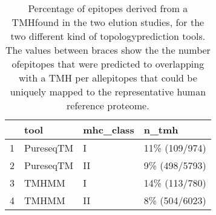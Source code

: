 \begin{table}[ht]
\centering
\begin{tabular}{rlll}
  \hline
 & tool & mhc\_class & n\_tmh \\ 
  \hline
1 & PureseqTM & I & 11\% (109/974) \\ 
  2 & PureseqTM & II & 9\% (498/5793) \\ 
  3 & TMHMM & I & 14\% (113/780) \\ 
  4 & TMHMM & II & 8\% (504/6023) \\ 
   \hline
\end{tabular}
\caption{Percentage of epitopes derived from a TMHfound in the two elution studies, for the two different kind of topologyprediction tools. The values between braces show the the number ofepitopes that were predicted to overlapping with a TMH per allepitopes that could be uniquely mapped to the representative human reference proteome.} 
\label{tab:elution}
\end{table}
